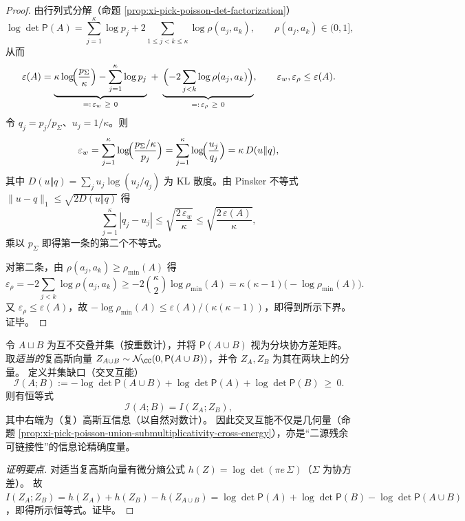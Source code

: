 \begin{proof}
由行列式分解（命题 \ref{prop:xi-pick-poisson-det-factorization}）
\[
\log\det\mathsf P(A)
=\sum_{j=1}^{\kappa}\log p_j+2\sum_{1\le j<k\le \kappa}\log\rho(a_j,a_k),
 \qquad \rho(a_j,a_k)\in(0,1],
\]
从而
\[
\varepsilon(A)
=\underbrace{\kappa\log\!\Bigl(\frac{p_{\Sigma}}{\kappa}\Bigr)-\sum_{j=1}^{\kappa}\log p_j}_{=:\,\varepsilon_w\ \ge\ 0}
\;+\;
\underbrace{\Bigl(-2\sum_{j<k}\log\rho(a_j,a_k)\Bigr)}_{=:\,\varepsilon_\rho\ \ge\ 0},
\qquad \varepsilon_w,\varepsilon_\rho\le \varepsilon(A).
\]
令 \(q_j=p_j/p_{\Sigma}\)、\(u_j=1/\kappa\)。则
\[
\varepsilon_w=\sum_{j=1}^{\kappa}\log\!\Bigl(\frac{p_{\Sigma}/\kappa}{p_j}\Bigr)
=\sum_{j=1}^{\kappa}\log\!\Bigl(\frac{u_j}{q_j}\Bigr)
=\kappa\,D(u\Vert q),
\]
其中 \(D(u\Vert q)=\sum_j u_j\log(u_j/q_j)\) 为 KL 散度。由 Pinsker 不等式
\(\|u-q\|_1\le\sqrt{2D(u\Vert q)}\)
得
\[
\sum_{j=1}^{\kappa}|q_j-u_j|
\le
\sqrt{\frac{2\,\varepsilon_w}{\kappa}}
\le
\sqrt{\frac{2\,\varepsilon(A)}{\kappa}},
\]
乘以 \(p_{\Sigma}\) 即得第一条的第二个不等式。
\par
对第二条，由 \(\rho(a_j,a_k)\ge\rho_{\min}(A)\) 得
\[
\varepsilon_\rho
=-2\sum_{j<k}\log\rho(a_j,a_k)
\ge
-2\binom{\kappa}{2}\log\rho_{\min}(A)
=\kappa(\kappa-1)\bigl(-\log\rho_{\min}(A)\bigr).
\]
又 \(\varepsilon_\rho\le \varepsilon(A)\)，故
\(-\log\rho_{\min}(A)\le \varepsilon(A)/(\kappa(\kappa-1))\)，即得到所示下界。证毕。
\end{proof}

\begin{proposition}\label{prop:xi-cross-energy-gaussian-mutual-information}
令 \(A\sqcup B\) 为互不交叠并集（按重数计），并将 \(\mathsf P(A\cup B)\) 视为分块协方差矩阵。
取\emph{适当的}复高斯向量 \(Z_{A\cup B}\sim\mathcal N_{\CC}(0,\mathsf P(A\cup B))\)，并令 \(Z_A,Z_B\) 为其在两块上的分量。
定义并集缺口（交叉互能）
\[
\mathcal I(A;B):=-\log\det\mathsf P(A\cup B)+\log\det\mathsf P(A)+\log\det\mathsf P(B)\ \ge\ 0.
\]
则有恒等式
\[
\boxed{\;
\mathcal I(A;B)=I(Z_A;Z_B),\;}
\]
其中右端为（复）高斯互信息（以自然对数计）。
因此交叉互能不仅是几何量（命题 \ref{prop:xi-pick-poisson-union-submultiplicativity-cross-energy}），亦是“二源残余可链接性”的信息论精确度量。
\end{proposition}
\begin{proof}[证明要点]
对适当复高斯向量有微分熵公式 \(h(Z)=\log\det(\pi e\,\Sigma)\)（\(\Sigma\) 为协方差）。
故
\(
I(Z_A;Z_B)=h(Z_A)+h(Z_B)-h(Z_{A\cup B})
=\log\det\mathsf P(A)+\log\det\mathsf P(B)-\log\det\mathsf P(A\cup B)
\)，即得所示恒等式。证毕。
\end{proof}

